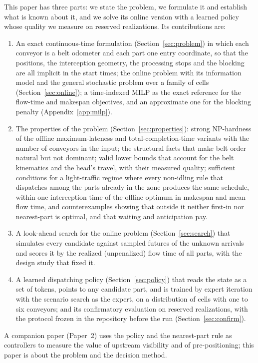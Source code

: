 \documentclass[11pt,a4paper]{article}
\theoremstyle{plain}
\theoremstyle{definition}
\theoremstyle{remark}
\begin{document}
This paper has three parts: we state the problem, we formulate it and establish what is
known about it, and we solve its online version with a learned policy whose quality we
measure on reserved realizations. Its contributions are:
\begin{enumerate}[nosep]
\item An exact continuous-time formulation (Section~\ref{sec:problem}) in which each
  conveyor is a belt odometer and each part one entry coordinate, so that the positions,
  the interception geometry, the processing stops and the blocking are all implicit in
  the start times; the online problem with its information model and the general
  stochastic problem over a family of cells (Section~\ref{sec:online}); a time-indexed
  MILP as the exact reference for the flow-time and makespan objectives, and an
  approximate one for the blocking penalty (Appendix~\ref{app:milp}).
\item The properties of the problem (Section~\ref{sec:properties}): strong NP-hardness
  of the offline maximum-lateness and total-completion-time variants with the number of
  conveyors in the input; the structural facts that make belt order
  natural but not dominant; valid lower bounds that account for the belt kinematics and
  the head's travel, with their measured quality; sufficient conditions for a
  light-traffic regime where every non-idling rule that dispatches among the parts
  already in the zone produces the same schedule, within one interception time of the
  offline optimum in makespan and mean flow time, and counterexamples showing that outside it neither first-in nor
  nearest-part is optimal, and that waiting and anticipation pay.
\item A look-ahead search for the online problem (Section~\ref{sec:search}) that
  simulates every candidate against sampled futures of the unknown arrivals and scores it
  by the realized (unpenalized) flow time of all parts, with the design study that fixed it.
\item A learned dispatching policy (Section~\ref{sec:policy}) that reads the state as a
  set of tokens, points to any candidate part, and is trained by expert iteration with
  the scenario search as the expert, on a distribution of cells with one to six
  conveyors; and its confirmatory evaluation on reserved realizations, with the protocol frozen in the repository before the run
  (Section~\ref{sec:confirm}).
\end{enumerate}
A companion paper (Paper~2) uses the policy and the nearest-part rule as controllers to
measure the value of upstream visibility and of pre-positioning; this paper is about the
problem and the decision method.
\end{document}
